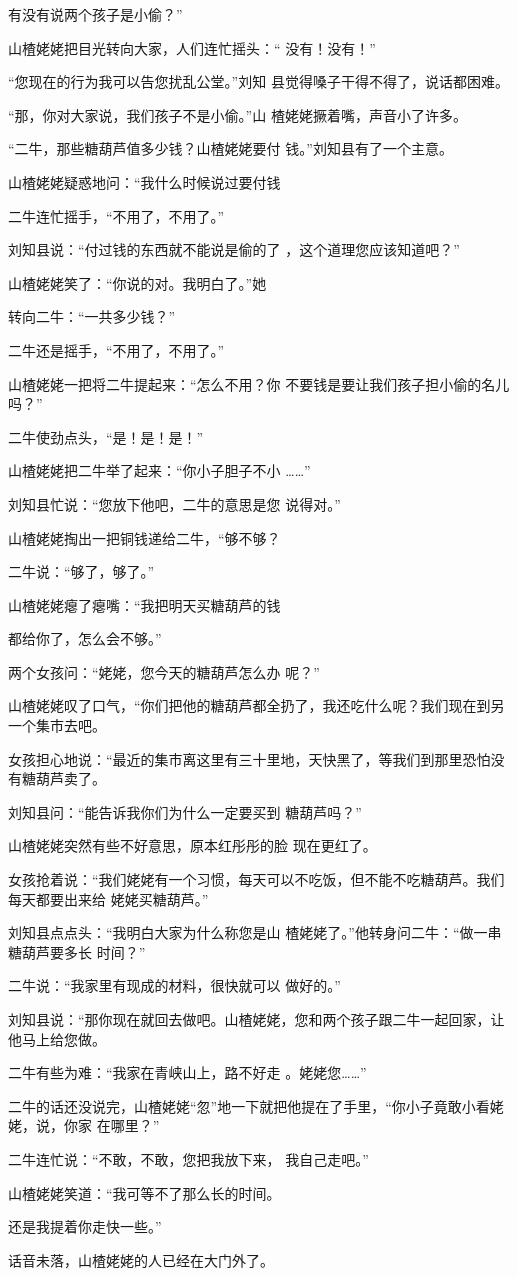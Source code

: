 \documentclass{article}
\begin{document}
\newpage
有没有说两个孩子是小偷？” 

山楂姥姥把目光转向大家，人们连忙摇头：“
没有！没有！” 

“您现在的行为我可以告您扰乱公堂。”刘知
县觉得嗓子干得不得了，说话都困难。 

“那，你对大家说，我们孩子不是小偷。”山
楂姥姥撅着嘴，声音小了许多。 

“二牛，那些糖葫芦值多少钱？山楂姥姥要付
钱。”刘知县有了一个主意。 

山楂姥姥疑惑地问：“我什么时候说过要付钱


二牛连忙摇手，“不用了，不用了。” 

刘知县说：“付过钱的东西就不能说是偷的了
，这个道理您应该知道吧？” 

山楂姥姥笑了：“你说的对。我明白了。”她
\newpage

转向二牛：“一共多少钱？” 


二牛还是摇手，“不用了，不用了。” 

山楂姥姥一把将二牛提起来：“怎么不用？你
不要钱是要让我们孩子担小偷的名儿吗？” 


二牛使劲点头，“是！是！是！” 

山楂姥姥把二牛举了起来：“你小子胆子不小
……” 

刘知县忙说：“您放下他吧，二牛的意思是您
说得对。” 

山楂姥姥掏出一把铜钱递给二牛，“够不够？


二牛说：“够了，够了。” 

山楂姥姥瘪了瘪嘴：“我把明天买糖葫芦的钱

\newpage
都给你了，怎么会不够。” 

两个女孩问：“姥姥，您今天的糖葫芦怎么办
呢？” 

山楂姥姥叹了口气，“你们把他的糖葫芦都全扔了，我还吃什么呢？我们现在到另一个集市去吧。

女孩担心地说：“最近的集市离这里有三十里地，天快黑了，等我们到那里恐怕没有糖葫芦卖了。

刘知县问：“能告诉我你们为什么一定要买到
糖葫芦吗？” 

山楂姥姥突然有些不好意思，原本红彤彤的脸
现在更红了。 

女孩抢着说：“我们姥姥有一个习惯，每天可以不吃饭，但不能不吃糖葫芦。我们每天都要出来给
姥姥买糖葫芦。” 

刘知县点点头：“我明白大家为什么称您是山
\newpage
楂姥姥了。”他转身问二牛：“做一串糖葫芦要多长
时间？” 

二牛说：“我家里有现成的材料，很快就可以
做好的。” 

刘知县说：“那你现在就回去做吧。山楂姥姥，您和两个孩子跟二牛一起回家，让他马上给您做。

二牛有些为难：“我家在青峡山上，路不好走
。姥姥您……” 

二牛的话还没说完，山楂姥姥“忽”地一下就把他提在了手里，“你小子竟敢小看姥姥，说，你家
在哪里？” 

二牛连忙说：“不敢，不敢，您把我放下来，
我自己走吧。” 

山楂姥姥笑道：“我可等不了那么长的时间。

\newpage
还是我提着你走快一些。” 

话音未落，山楂姥姥的人已经在大门外了。
\end{document}
